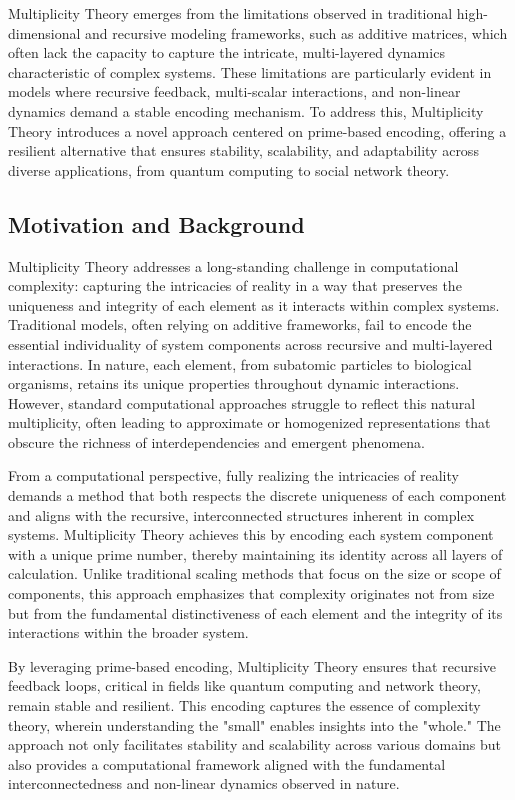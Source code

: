 \documentclass{article}
\theoremstyle{plain}
\begin{document}
Multiplicity Theory emerges from the limitations observed in traditional high-dimensional and recursive modeling frameworks, such as additive matrices, which often lack the capacity to capture the intricate, multi-layered dynamics characteristic of complex systems. These limitations are particularly evident in models where recursive feedback, multi-scalar interactions, and non-linear dynamics demand a stable encoding mechanism. To address this, Multiplicity Theory introduces a novel approach centered on prime-based encoding, offering a resilient alternative that ensures stability, scalability, and adaptability across diverse applications, from quantum computing to social network theory.

\subsection{Motivation and Background}

Multiplicity Theory addresses a long-standing challenge in computational complexity: capturing the intricacies of reality in a way that preserves the uniqueness and integrity of each element as it interacts within complex systems. Traditional models, often relying on additive frameworks, fail to encode the essential individuality of system components across recursive and multi-layered interactions. In nature, each element, from subatomic particles to biological organisms, retains its unique properties throughout dynamic interactions. However, standard computational approaches struggle to reflect this natural multiplicity, often leading to approximate or homogenized representations that obscure the richness of interdependencies and emergent phenomena.

From a computational perspective, fully realizing the intricacies of reality demands a method that both respects the discrete uniqueness of each component and aligns with the recursive, interconnected structures inherent in complex systems. Multiplicity Theory achieves this by encoding each system component with a unique prime number, thereby maintaining its identity across all layers of calculation. Unlike traditional scaling methods that focus on the size or scope of components, this approach emphasizes that complexity originates not from size but from the fundamental distinctiveness of each element and the integrity of its interactions within the broader system.

By leveraging prime-based encoding, Multiplicity Theory ensures that recursive feedback loops, critical in fields like quantum computing and network theory, remain stable and resilient. This encoding captures the essence of complexity theory, wherein understanding the "small" enables insights into the "whole." The approach not only facilitates stability and scalability across various domains but also provides a computational framework aligned with the fundamental interconnectedness and non-linear dynamics observed in nature.
\end{document}
